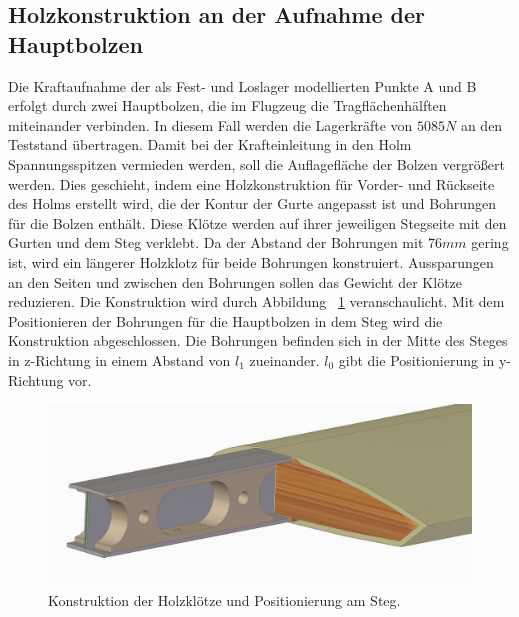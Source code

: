 \subsection{Holzkonstruktion an der Aufnahme der Hauptbolzen}
Die Kraftaufnahme der  als Fest- und Loslager modellierten Punkte A und B erfolgt durch zwei Hauptbolzen, die im Flugzeug die Tragflächenhälften miteinander verbinden. In diesem Fall werden die Lagerkräfte von $ 5085N $ an den Teststand übertragen. Damit bei der Krafteinleitung in den Holm Spannungsspitzen vermieden werden, soll die Auflagefläche der Bolzen vergrößert werden. Dies geschieht, indem eine Holzkonstruktion für Vorder- und Rückseite des Holms erstellt wird, die der Kontur der Gurte angepasst ist und Bohrungen für die Bolzen enthält. Diese Klötze werden auf ihrer jeweiligen Stegseite mit den Gurten und dem Steg verklebt. Da der Abstand der Bohrungen mit $ 76mm $ gering ist, wird ein längerer Holzklotz für beide Bohrungen konstruiert. Aussparungen an den Seiten und zwischen den Bohrungen sollen das Gewicht der Klötze reduzieren. Die Konstruktion wird durch Abbildung ~\ref{fig: Klotz} veranschaulicht. Mit dem Positionieren der Bohrungen für die Hauptbolzen in dem Steg wird die Konstruktion abgeschlossen. Die Bohrungen befinden sich in der Mitte des Steges in z-Richtung in einem Abstand von $ l_{1} $ zueinander. $ l_{0} $ gibt die Positionierung in y-Richtung vor. 
\begin{figure}[h]
	\includegraphics[width=1.0\textwidth]{Bilder/Klotz.jpg}
	\caption{Konstruktion der Holzklötze und Positionierung am Steg.}
	\label{fig: Klotz}
\end{figure}

